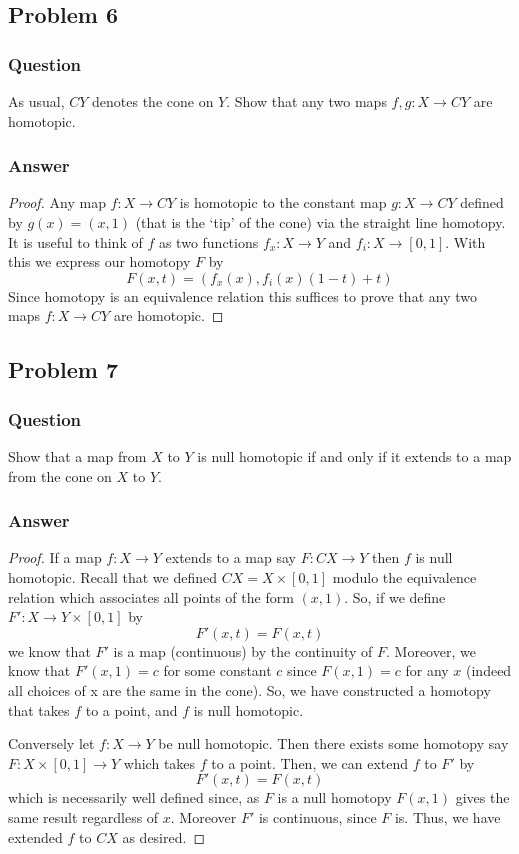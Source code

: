 \documentclass[10pt]{article}
\begin{document}
\subsection{Problem 6}
\subsubsection{Question}
As usual, $CY$ denotes the cone on $Y$. Show that any two maps $f, g:X\to CY$ are homotopic.
\subsubsection{Answer}
\begin{proof}
Any map $f: X \to CY$ is homotopic to the constant map $g: X \to CY$ defined by $g(x)=(x,1)$ (that is the `tip' of the cone) via the straight line homotopy. It is useful to think of $f$ as two functions $f_x: X \to Y$ and $f_i : X \to [0,1]$. With this we express our homotopy $F$ by 
\[F(x,t)=(f_x(x),f_i(x)(1-t)+t)\]
Since homotopy is an equivalence relation this suffices to prove that any two maps $f:X \to CY$ are homotopic.
\end{proof}


\subsection{Problem 7}
\subsubsection{Question}
Show that a map from $X$ to $Y$ is null homotopic if and only if it extends to a map from the cone on $X$ to $Y$.
\subsubsection{Answer}
\begin{proof}
If a map $f: X \to Y$ extends to a map say $F : CX \to Y$ then $f$ is null homotopic. Recall that we defined $CX = X \times [0,1]$ modulo the equivalence relation which associates all points of the form $(x,1)$. So, if we define $F': X \to Y \times [0,1]$ by 
\[F'(x,t)=F(x,t)\]
we know that $F'$ is a map (continuous) by the continuity of $F$. Moreover, we know that $F'(x,1)=c$ for some constant $c$ since $F(x,1)=c$ for any $x$ (indeed all choices of x are the same in the cone). So, we have constructed a homotopy that takes $f$ to a point, and $f$ is null homotopic.

Conversely let $f: X \to Y$ be null homotopic. Then there exists some homotopy say $F: X \times [0,1] \to Y$ which takes $f$ to a point. Then, we can extend $f$ to $F'$ by
\[F'(x,t)=F(x,t)\]
which is necessarily well defined since, as $F$ is a null homotopy $F(x,1)$ gives the same result regardless of $x$. Moreover $F'$ is continuous, since $F$ is. Thus, we have extended $f$ to $CX$ as desired.
\end{proof}
\end{document}

